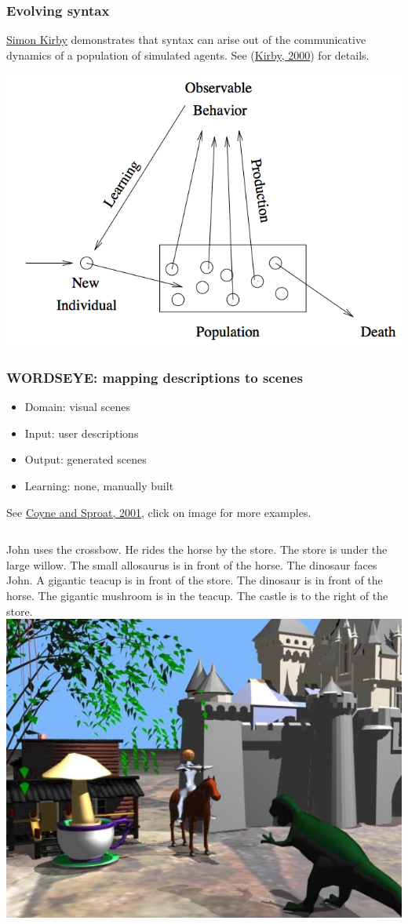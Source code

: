 \documentclass[ignorenonframetext]{beamer}
\begin{document}
\begin{frame}\frametitle{Evolving syntax}
\href{http://www.lel.ed.ac.uk/~simon/}{Simon Kirby} demonstrates that
syntax can arise out of the communicative dynamics of a population of
simulated agents.  See
(\href{http://goo.gl/wCTFRv}{Kirby, 2000}) 
for details.
\vspace{1em}
\begin{center}
\includegraphics[width=.7\textwidth]{images/kirby-syntax.png}
\end{center}
\end{frame}

\begin{frame}\frametitle{WORDSEYE: mapping descriptions to scenes}
\begin{itemize}
\item Domain: visual scenes
\item Input: user descriptions
\item Output: generated scenes
\item Learning: none, manually built
\end{itemize}
See \href{http://www1.cs.columbia.edu/~coyne/papers/wordseye_siggraph.pdf}{Coyne and Sproat, 2001}, click on image for more examples.
\begin{columns}[c]
\scriptsize
John uses the crossbow. He rides the horse by the store.
The store is under the large willow. The small allosaurus is in front
of the horse. The dinosaur faces John. A gigantic teacup is in front
of the store. The dinosaur is in front of the horse. The gigantic
mushroom is in the teacup. The castle is to the right of the store.
\href{http://www.wordseye.com}{
\includegraphics[height=.6\textwidth]{images/coyne-wordseye.png}}
\end{columns}
\end{frame}
\end{document}
